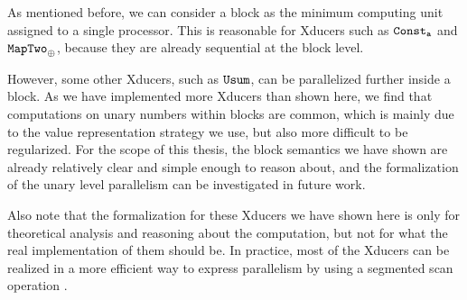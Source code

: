 As mentioned before, we can consider a block  as the minimum computing unit assigned to a single processor. This is reasonable for
Xducers such as $\mathtt{Const_{a}}$ and $\mathtt{MapTwo}_{\oplus}$, because
they are already sequential at the block level. 

However, some other Xducers, such as $\mathtt{Usum}$, can be parallelized further inside a block.
As we have implemented more Xducers than shown here, we find that computations on unary numbers within blocks are common, which is mainly due to the value representation strategy we use, but also more difficult to be regularized.
For the scope of this thesis, the block semantics we have shown are already relatively clear and simple enough to reason about, and the formalization of the unary level parallelism can be investigated in future work. 


Also note that the formalization for these Xducers we have shown here is only for theoretical analysis and reasoning about the computation, but not for what the real implementation of them should be. 
In practice, most of the Xducers can be realized in a more efficient way to express parallelism by using a segmented scan operation \cite{blel89scan}. 

%
%
%
%
%
%
%
%
%
%
%
%
%

